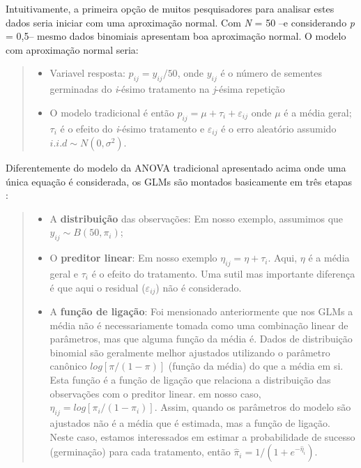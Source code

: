 \documentclass[
]{book}
\begin{document}
Intuitivamente, a primeira opção de muitos pesquisadores para analisar estes dados seria iniciar com uma aproximação normal. Com \emph{N} = 50 --e considerando \emph{p} = 0,5-- mesmo dados binomiais apresentam boa aproximação normal. O modelo com aproximação normal seria:

\begin{quote}
\begin{itemize}
\item
  Variavel resposta: \(p_{ij} = y_{ij}/50\), onde \(y_{ij}\) é o número de sementes germinadas do \emph{i}-ésimo tratamento na \emph{j}-ésima repetição
\item
  O modelo tradicional é então \(p_{ij} = \mu + \tau_i + \varepsilon_{ij}\) onde \(\mu\) é a média geral; \(\tau_i\) é o efeito do \emph{i}-ésimo tratamento e \(\varepsilon_{ij}\) é o erro aleatório assumido \(i.i.d \sim N(0, \sigma^2 )\).
\end{itemize}
\end{quote}

Diferentemente do modelo da ANOVA tradicional apresentado acima onde uma única equação é considerada, os GLMs são montados basicamente em três etapas \citep{Stroup2013}:

\begin{quote}
\begin{itemize}
\item
  A \textbf{distribuição} das observações: Em nosso exemplo, assumimos que \(y_{ij} \sim B(50, \pi_i)\);
\item
  O \textbf{preditor linear}: Em nosso exemplo \(\eta_{ij} = \eta + \tau_{i}\). Aqui, \(\eta\) é a média geral e \(\tau_{i}\) é o efeito do tratamento. Uma sutil mas importante diferença é que aqui o residual (\(\varepsilon_{ij}\)) não é considerado.
\item
  A \textbf{função de ligação}: Foi mensionado anteriormente que nos GLMs a média não é necessariamente tomada como uma combinação linear de parâmetros, mas que alguma função da média é. Dados de distribuição binomial são geralmente melhor ajustados utilizando o parâmetro canônico \(log[\pi/(1-\pi)]\) (função da média) do que a média em si. Esta função é a função de ligação que relaciona a distribuição das observações com o preditor linear. em nosso caso, \(\eta_{ij} = log[\pi_{i}/(1-\pi_{i})]\). Assim, quando os parâmetros do modelo são ajustados não é a média que é estimada, mas a função de ligação. Neste caso, estamos interessados em estimar a probabilidade de sucesso (germinação) para cada tratamento, então \(\hat \pi_{i} = 1/(1 + e ^ {-\hat \eta_{i}})\).
\end{itemize}
\end{quote}
\end{document}
